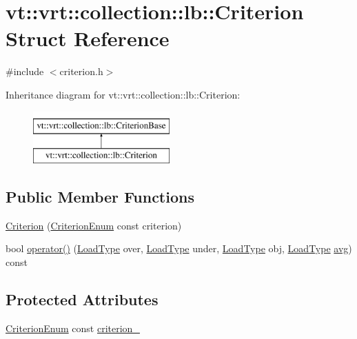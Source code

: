 \hypertarget{structvt_1_1vrt_1_1collection_1_1lb_1_1_criterion}{}\section{vt\+:\+:vrt\+:\+:collection\+:\+:lb\+:\+:Criterion Struct Reference}
\label{structvt_1_1vrt_1_1collection_1_1lb_1_1_criterion}


{\ttfamily \#include $<$criterion.\+h$>$}

Inheritance diagram for vt\+:\+:vrt\+:\+:collection\+:\+:lb\+:\+:Criterion\+:\begin{figure}[H]
\begin{center}
\leavevmode
\includegraphics[height=2.000000cm]{structvt_1_1vrt_1_1collection_1_1lb_1_1_criterion}
\end{center}
\end{figure}
\subsection*{Public Member Functions}
\begin{DoxyCompactItemize}
\item 
\hyperlink{structvt_1_1vrt_1_1collection_1_1lb_1_1_criterion_a05ee5b1e640c221b321a2a4bd7f3c5ba}{Criterion} (\hyperlink{namespacevt_1_1vrt_1_1collection_1_1lb_a4e454750e102cf5404d5ac151148951c}{Criterion\+Enum} const criterion)
\item 
bool \hyperlink{structvt_1_1vrt_1_1collection_1_1lb_1_1_criterion_a0e00fffc188ecbc09008fe84afb60643}{operator()} (\hyperlink{structvt_1_1vrt_1_1collection_1_1lb_1_1_criterion_base_a78e6b14fc6f7b34acac1d7cd4e850180}{Load\+Type} over, \hyperlink{structvt_1_1vrt_1_1collection_1_1lb_1_1_criterion_base_a78e6b14fc6f7b34acac1d7cd4e850180}{Load\+Type} under, \hyperlink{structvt_1_1vrt_1_1collection_1_1lb_1_1_criterion_base_a78e6b14fc6f7b34acac1d7cd4e850180}{Load\+Type} obj, \hyperlink{structvt_1_1vrt_1_1collection_1_1lb_1_1_criterion_base_a78e6b14fc6f7b34acac1d7cd4e850180}{Load\+Type} \hyperlink{namespacevt_1_1vrt_1_1collection_1_1lb_a74989c7b4dd16fcc067e90a29cd1febeae322d423f075b0ab2daad27011d24909}{avg}) const
\end{DoxyCompactItemize}
\subsection*{Protected Attributes}
\begin{DoxyCompactItemize}
\item 
\hyperlink{namespacevt_1_1vrt_1_1collection_1_1lb_a4e454750e102cf5404d5ac151148951c}{Criterion\+Enum} const \hyperlink{structvt_1_1vrt_1_1collection_1_1lb_1_1_criterion_abec00c435938c265ec0b3e3d984c09a6}{criterion\+\_\+}
\end{DoxyCompactItemize}
